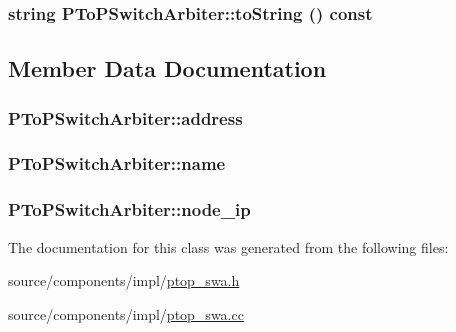 \hypertarget{classPToPSwitchArbiter_f85a552b1be155e2717c197a51799414}{
\subsubsection[{toString}]{\setlength{\rightskip}{0pt plus 5cm}string PToPSwitchArbiter::toString () const}}
\label{classPToPSwitchArbiter_f85a552b1be155e2717c197a51799414}




\subsection{Member Data Documentation}
\hypertarget{classPToPSwitchArbiter_a01c0b9c63131ca029da5129d417ce0e}{
\subsubsection[{address}]{ {\bf PToPSwitchArbiter::address}}}
\label{classPToPSwitchArbiter_a01c0b9c63131ca029da5129d417ce0e}


\hypertarget{classPToPSwitchArbiter_dd46ae5be50681b3e7e0a779466fe8e4}{
\subsubsection[{name}]{ {\bf PToPSwitchArbiter::name}}}
\label{classPToPSwitchArbiter_dd46ae5be50681b3e7e0a779466fe8e4}


\hypertarget{classPToPSwitchArbiter_f6d6c3726dfca65b1dec2d041ce29e97}{
\subsubsection[{node\_\-ip}]{ {\bf PToPSwitchArbiter::node\_\-ip}}}
\label{classPToPSwitchArbiter_f6d6c3726dfca65b1dec2d041ce29e97}




The documentation for this class was generated from the following files:\begin{CompactItemize}
\item 
source/components/impl/\hyperlink{ptop__swa_8h}{ptop\_\-swa.h}\item 
source/components/impl/\hyperlink{ptop__swa_8cc}{ptop\_\-swa.cc}\end{CompactItemize}
